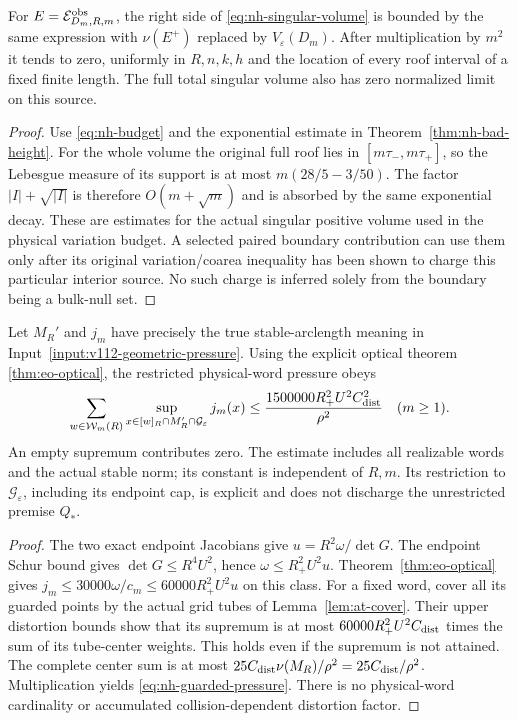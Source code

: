 \begin{corollary}
\label{cor:nh-singular-payment}
For $E=\mathcal E^{\rm obs}_{D_m,R,m}$, the right side of
\eqref{eq:nh-singular-volume} is bounded by the same expression
with $\nu(E^+)$ replaced by $V_\varepsilon(D_m)$.
After multiplication by $m^2$ it tends to zero, uniformly in
$R,n,k,h$ and the location of every roof interval of a fixed
finite length.  The full total singular volume also has zero
normalized limit on this source.
\end{corollary}
\begin{proof}
Use \eqref{eq:nh-budget} and the exponential estimate in
Theorem~\ref{thm:nh-bad-height}.  For the whole volume the
original full roof lies in $[m\tau_-,m\tau_+]$, so the
Lebesgue measure of its support is at most
$m(28/5-3/50)$.  The factor $|I|+\sqrt{|I|}$ is therefore
$O(m+\sqrt m)$ and is absorbed by the same exponential decay.
These are estimates for the actual singular positive volume
used in the physical variation budget.  A selected paired
boundary contribution can use them only after its original
variation/coarea inequality has been shown to charge this
particular interior source.  No such charge is inferred solely
from the boundary being a bulk-null set.
\end{proof}

\begin{corollary}
\label{cor:nh-guarded-pressure}
Let $M_R'$ and $j_m$ have precisely the true stable-arclength
meaning in Input~\ref{input:v112-geometric-pressure}.
Using the explicit optical theorem
\ref{thm:eo-optical}, the restricted physical-word pressure obeys
\begin{equation}\label{eq:nh-guarded-pressure}
 \sum_{w\in\mathcal W_m(R)}
       \sup_{x\in[w]_R\cap M_R'\cap\mathcal G_\varepsilon}j_m(x)
 \le \frac{1500000 R_+^2U^2C_{\rm dist}^2}{\rho^2}
                         \quad(m\ge1).
\end{equation}
An empty supremum contributes zero.  The estimate includes all
realizable words and the actual stable norm; its constant is
independent of $R,m$.  Its restriction to
$\mathcal G_\varepsilon$, including its endpoint cap, is
explicit and does not discharge the unrestricted premise $Q_*$.
\end{corollary}
\begin{proof}
The two exact endpoint Jacobians give
$u=R^2\omega/\det G$.
The endpoint Schur bound gives
$\det G\le R^4U^2$, hence $\omega\le R_+^2U^2u$.
Theorem~\ref{thm:eo-optical} gives
$j_m\le30000\omega/c_m\le60000R_+^2U^2u$ on this class.
For a fixed word, cover all its guarded points by the actual
grid tubes of Lemma~\ref{lem:at-cover}.  Their upper distortion
bounds show that its supremum is at most
$60000R_+^2U^2C_{\rm dist}$ times the sum of its tube-center
weights.  This holds even if the supremum is not attained.
The complete center sum is at most
$25C_{\rm dist}\nu(M_R)/\rho^2=25C_{\rm dist}/\rho^2$.
Multiplication yields \eqref{eq:nh-guarded-pressure}.
There is no physical-word cardinality or accumulated
collision-dependent distortion factor.
\end{proof}

